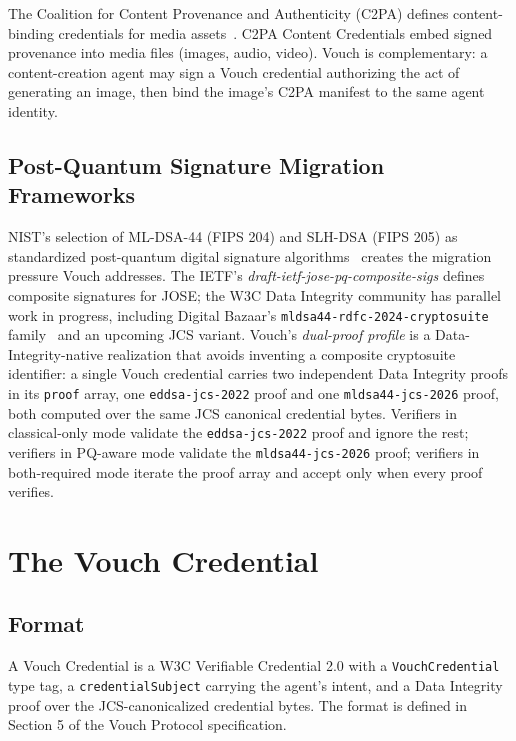 \documentclass[11pt,a4paper,twocolumn]{article}
\begin{document}
The Coalition for Content Provenance and Authenticity (C2PA) defines content-binding credentials for media assets~\cite{c2pa14}. C2PA Content Credentials embed signed provenance into media files (images, audio, video). Vouch is complementary: a content-creation agent may sign a Vouch credential authorizing the act of generating an image, then bind the image's C2PA manifest to the same agent identity.

\subsection{Post-Quantum Signature Migration Frameworks}

NIST's selection of ML-DSA-44 (FIPS 204) and SLH-DSA (FIPS 205) as standardized post-quantum digital signature algorithms~\cite{nistfips204} creates the migration pressure Vouch addresses. The IETF's \emph{draft-ietf-jose-pq-composite-sigs} defines composite signatures for JOSE; the W3C Data Integrity community has parallel work in progress, including Digital Bazaar's \texttt{mldsa44-rdfc-2024-cryptosuite} family~\cite{db-mldsa44} and an upcoming JCS variant. Vouch's \emph{dual-proof profile} is a Data-Integrity-native realization that avoids inventing a composite cryptosuite identifier: a single Vouch credential carries two independent Data Integrity proofs in its \verb|proof| array, one \texttt{eddsa-jcs-2022} proof and one \texttt{mldsa44-jcs-2026} proof, both computed over the same JCS canonical credential bytes. Verifiers in classical-only mode validate the \texttt{eddsa-jcs-2022} proof and ignore the rest; verifiers in PQ-aware mode validate the \texttt{mldsa44-jcs-2026} proof; verifiers in both-required mode iterate the proof array and accept only when every proof verifies.

\section{The Vouch Credential}
\label{sec:credential}

\subsection{Format}

A Vouch Credential is a W3C Verifiable Credential 2.0 with a \texttt{VouchCredential} type tag, a \verb|credentialSubject| carrying the agent's intent, and a Data Integrity proof over the JCS-canonicalized credential bytes. The format is defined in Section 5 of the Vouch Protocol specification.
\end{document}
